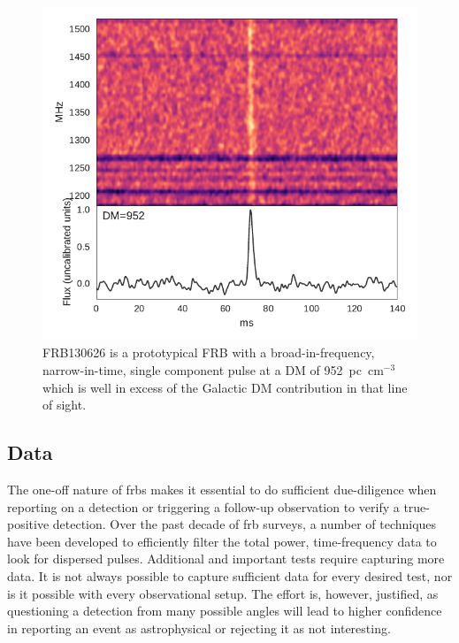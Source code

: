 \documentclass[a4paper,fleqn,usenatbib]{mnras}
\begin{document}
\begin{figure}
    \includegraphics[width=1.0\linewidth]{figures/FRB130626.pdf}
    \caption{FRB130626 is a prototypical FRB with a broad-in-frequency,
    narrow-in-time, single component pulse at a DM of 952~pc~cm$^{-3}$ which is well in
    excess of the Galactic DM contribution in that line of sight.
    }
    \label{fig:FRB130626}
\end{figure}
\subsection{Data}
\label{sec:detect_report}

The one-off nature of \glspl{frb} makes it essential to do sufficient
due-diligence when reporting on a detection or triggering a follow-up
observation to verify a true-positive detection. Over the past decade of
\gls{frb} surveys, a number of techniques have been developed to efficiently
filter the total power, time-frequency data to look for dispersed pulses. Additional and
important tests require capturing more data. It is not always possible to
capture sufficient data for every desired test, nor is it possible with every
observational setup.  The effort is, however, justified, as questioning a
detection from many possible angles will lead to higher confidence in reporting
an event as astrophysical or rejecting it as not interesting. 
\end{document}
